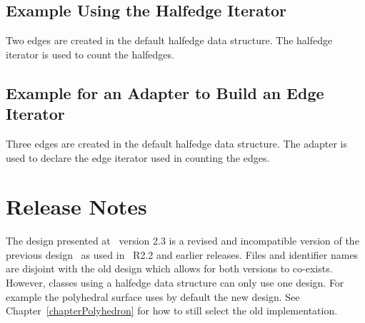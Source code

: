\subsection{Example Using the Halfedge Iterator}

Two edges are created in the default halfedge data structure.
The halfedge iterator is used to count the halfedges.


\subsection{Example for an Adapter to Build an Edge Iterator}

Three edges are created in the default halfedge data structure.
The adapter  is used to declare the edge
iterator used in counting the edges.


\section{Release Notes}



The design presented at \cgal\ version 2.3 is a revised and incompatible version of the
previous design~\cite{k-ddsps-98} as used in \cgal\ R2.2 and earlier
releases. Files and identifier names are disjoint with the old design
which allows for both versions to co-exists. However, classes using a
halfedge data structure can only use one design. For example the
polyhedral surface  uses by default the new
design. See Chapter~\ref{chapterPolyhedron} for how to still select
the old implementation.


